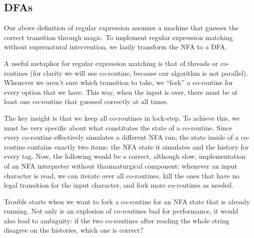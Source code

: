 \documentclass[english,twocolumn]{article}
\theoremstyle{definition}
\newcommand{\seclabel}[1]{\label{sec:#1}}
\begin{document}
\subsection{DFAs}	\seclabel{dfa}

Our above definition of regular expression assumes a machine that
guesses the correct transition through magic. To implement regular
expression matching without supernatural intervention, we lazily transform
the NFA to a DFA. 

A useful metaphor for regular expression matching is that of 
threads\cite{Cox07a} or co-routines (for clarity we will use 
co-routine, because our algorithm is not parallel).
Whenever we aren't sure which transition to take,
we ``fork'' a co-routine for every option that we have. This way, when
the input is over, there must be at least one co-routine that guessed
correctly at all times. 

The key insight is that we keep all co-routines in lock-step. To
achieve this, we must be very specific about what constitutes the
state of a co-routine. Since every co-routine effectively simulates a different
NFA run, the state inside of a co-routine contains exactly two items: the
NFA state it simulates and the history for every tag. Now, the following
would be a correct, although slow, implementation of an NFA
interpreter without thaumaturgical component: whenever an input character
is read, we can iterate over
all co-routines, kill the ones that have no legal transition for the input
character, and fork more co-routines as needed.

Trouble starts when we want to fork a co-routine for an NFA state that
is already running. Not only is an explosion of co-routines bad for
performance, it would also lead to ambiguity: if the two co-routines
after reading the whole string disagree on the histories, which one is correct?
\end{document}
